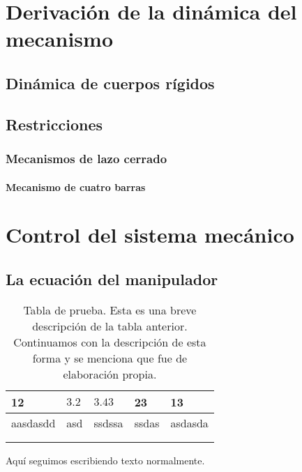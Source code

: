 \chapter{Derivación de la dinámica del mecanismo}

\section{Dinámica de cuerpos rígidos}

\section{Restricciones}
\subsection{Mecanismos de lazo cerrado}
\subsubsection{Mecanismo de cuatro barras}

\chapter{Control del sistema mecánico}

\section{La ecuación del manipulador}

\begin{table}[h]
\begin{tabular}{|l|l|l|l|l|}
\hline
12       & $3.2$  & $3.43$    & 23    & 13      \\ \hline
aasdasdd & asd & ssdssa & ssdas & asdasda \\ \hline
         &     &        &       &         \\ \hline
         &     &        &       &         \\ \hline
\end{tabular}
\caption[Tabla de prueba]{Tabla de prueba. Esta es una breve descripción de la tabla anterior. Continuamos con la descripción de esta forma y se menciona que fue de elaboración propia.} 
\label{cuadro:tablaprueba}
\end{table}

Aquí seguimos escribiendo texto normalmente.